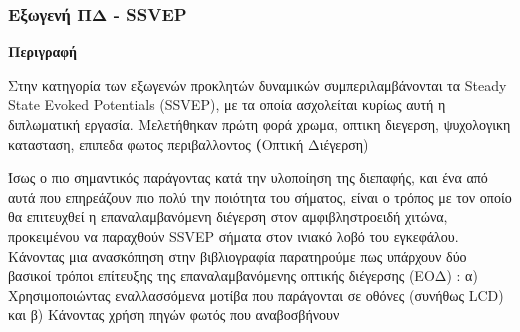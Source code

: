 \documentclass[11pt,a4paper,english,greek,twoside]{../Thesis}
\begin{document}
    \subsubsection{Εξωγενή ΠΔ - SSVEP}  
      \textbf{Περιγραφή}
      \par Στην κατηγορία των εξωγενών προκλητών δυναμικών συμπεριλαμβάνονται τα Steady State Evoked Potentials (SSVEP), με τα οποία ασχολείται κυρίως αυτή η διπλωματική εργασία. Μελετήθηκαν πρώτη φορά %
        χρωμα, οπτικη διεγερση, ψυχολογικη κατασταση, επιπεδα φωτος περιβαλλοντος
      \textbf(Οπτική Διέγερση)
      \label{subsec:visual_stimulus}  
      \par Ίσως ο πιο σημαντικός παράγοντας κατά την υλοποίηση της διεπαφής, και ένα από αυτά που επηρεάζουν πιο πολύ την ποιότητα του σήματος,  είναι ο τρόπος με τον οποίο θα επιτευχθεί η επαναλαμβανόμενη διέγερση στον αμφιβληστροειδή χιτώνα, προκειμένου να παραχθούν SSVEP σήματα στον ινιακό λοβό του εγκεφάλου. Κάνοντας μια ανασκόπηση στην βιβλιογραφία παρατηρούμε πως υπάρχουν δύο βασικοί τρόποι επίτευξης της επαναλαμβανόμενης οπτικής διέγερσης (ΕΟΔ) : α) Χρησιμοποιώντας εναλλασσόμενα μοτίβα που παράγονται σε οθόνες (συνήθως LCD) και β) Κάνοντας χρήση πηγών φωτός που αναβοσβήνουν
    
    
\end{document}
